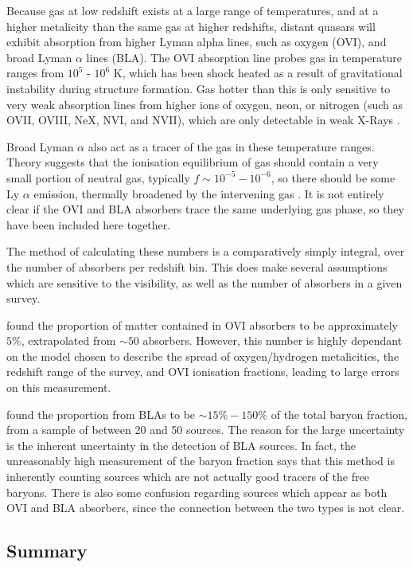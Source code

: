 Because gas at low redshift exists at a large range of temperatures, and at a higher metalicity than the same gas at higher redshifts, distant quasars will exhibit absorption from higher Lyman alpha lines, such as oxygen (OVI), and broad Lyman $\alpha$ lines (BLA). The OVI absorption line probes gas in temperature ranges from $10^5$ - $10^6$ K, which has been shock heated as a result of gravitational instability during structure formation. Gas hotter than this is only sensitive to very weak absorption lines from higher ions of oxygen, neon, or nitrogen (such as OVII, OVIII, NeX, NVI, and NVII), which are only detectable in weak X-Rays \citep{2005ApJ...624..555D}. 
\par Broad Lyman $\alpha$ also act as a tracer of the gas in these temperature ranges. Theory suggests that the ionisation equilibrium of gas should contain a very small portion of neutral gas, typically $f \sim 10^{-5} - 10^{-6}$, so there should be some Ly $\alpha$ emission, thermally broadened by the intervening gas \citep{2006A&A...445..827R}. It is not entirely clear if the OVI and BLA absorbers trace the same underlying gas phase, so they have been included here together. 
\par The method of calculating these numbers is a comparatively simply integral, over the number of absorbers per redshift bin. This does make several assumptions which are sensitive to the visibility, as well as the number of absorbers in a given survey. \par \cite{2005ApJ...624..555D} found the proportion of matter contained in OVI absorbers to be approximately $5\%$, extrapolated from $\sim 50$ absorbers. However, this number is highly dependant on the model chosen to describe the spread of oxygen/hydrogen metalicities, the redshift range of the survey, and OVI ionisation fractions, leading to large errors on this measurement. 
\par \cite{2006A&A...445..827R} found the proportion from BLAs to be $\sim 15 \% - 150 \%$ of the total baryon fraction, from a sample of between 20 and 50 sources. The reason for the large uncertainty is the inherent uncertainty in the detection of BLA sources. In fact, the unreasonably high measurement of the baryon fraction says that this method is inherently counting sources which are not actually good tracers of the free baryons. There is also some confusion regarding sources which appear as both OVI and BLA absorbers, since the connection between the two types is not clear. 

\subsection{Summary}

